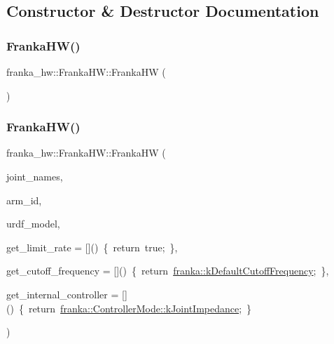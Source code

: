 \subsection{Constructor \& Destructor Documentation}
\mbox{\label{classfranka__hw_1_1FrankaHW_a07f709fd8367ebf376214e4decf8cf57}} 
\subsubsection{\texorpdfstring{Franka\+H\+W()}{FrankaHW()}\hspace{0.1cm}{\footnotesize\ttfamily [1/3]}}
{\footnotesize\ttfamily franka\+\_\+hw\+::\+Franka\+H\+W\+::\+Franka\+HW (\begin{DoxyParamCaption}{ }\end{DoxyParamCaption})\hspace{0.3cm}{\ttfamily [delete]}}

\mbox{\label{classfranka__hw_1_1FrankaHW_aa8af6654cc9b7562545a59c035e245b9}} 
\subsubsection{\texorpdfstring{Franka\+H\+W()}{FrankaHW()}\hspace{0.1cm}{\footnotesize\ttfamily [2/3]}}
{\footnotesize\ttfamily franka\+\_\+hw\+::\+Franka\+H\+W\+::\+Franka\+HW (\begin{DoxyParamCaption}\item[{const std\+::array$<$ std\+::string, 7 $>$ \&}]{joint\+\_\+names,  }\item[{const std\+::string \&}]{arm\+\_\+id,  }\item[{const urdf\+::\+Model \&}]{urdf\+\_\+model,  }\item[{std\+::function$<$ \hyperlink{classbool}{bool}()$>$}]{get\+\_\+limit\+\_\+rate = {\ttfamily \mbox{[}\mbox{]}()~\{~return~true;~\}},  }\item[{std\+::function$<$ double()$>$}]{get\+\_\+cutoff\+\_\+frequency = {\ttfamily \mbox{[}\mbox{]}()~\{~return~\hyperlink{namespacefranka_ad8e3b7da346e03181ab5ac138a4171d4}{franka\+::k\+Default\+Cutoff\+Frequency};~\}},  }\item[{std\+::function$<$ \hyperlink{namespacefranka_a3e20bc77587e2c0c53598753e3f4816b}{franka\+::\+Controller\+Mode}()$>$}]{get\+\_\+internal\+\_\+controller = {\ttfamily \mbox{[}\mbox{]}()~\{~return~\hyperlink{namespacefranka_a3e20bc77587e2c0c53598753e3f4816baa7cd8fc7552b5b9c50684e57f032d724}{franka\+::\+Controller\+Mode\+::k\+Joint\+Impedance};~\}} }\end{DoxyParamCaption})}

